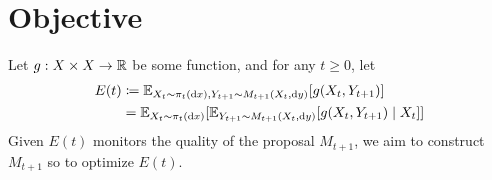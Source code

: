 


\section{Objective}
Let $g : X\times X \to \mathbb{R}$ be some function, and for any $t\geq 0$, let
\begin{equation}
    \begin{split}
        \label{eq:criteria}
        E(t)&\coloneq \mathbb{E}_{X_t\sim \pi_t(\mathrm{d} x), Y_{t+1}\sim M_{t+1}(X_t, \mathrm{d} y)}[g(X_t, Y_{t+1})]\\
        &= \mathbb{E}_{X_t\sim \pi_t(\mathrm{d} x)}[\mathbb{E}_{Y_{t+1}\sim M_{t+1}(X_t,\mathrm{d} y)}[g(X_t, Y_{t+1})\mid X_t]]
    \end{split}
\end{equation}
Given $E(t)$ monitors the quality of the proposal $M_{t+1}$, we aim to construct $M_{t+1}$ so to optimize $E(t)$.


